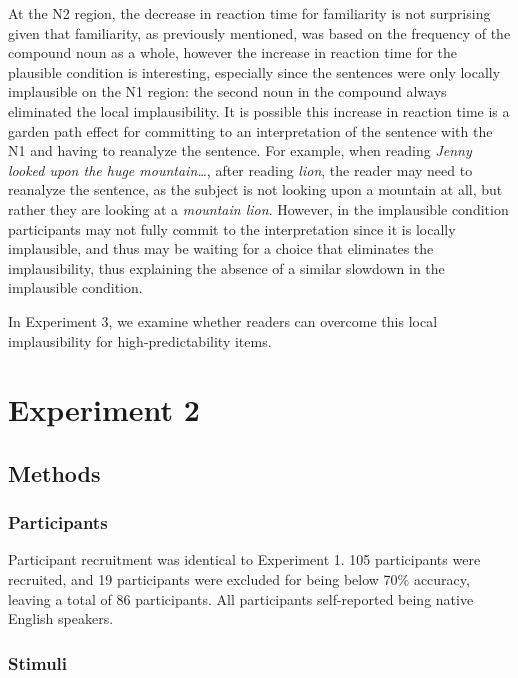 \documentclass[
  12pt,
  letterpaper,
]{scrreprt}
\begin{document}
At the N2 region, the decrease in reaction time for familiarity is not
surprising given that familiarity, as previously mentioned, was based on
the frequency of the compound noun as a whole, however the increase in
reaction time for the plausible condition is interesting, especially
since the sentences were only locally implausible on the N1 region: the
second noun in the compound always eliminated the local implausibility.
It is possible this increase in reaction time is a garden path effect
for committing to an interpretation of the sentence with the N1 and
having to reanalyze the sentence. For example, when reading \emph{Jenny
looked upon the huge mountain\ldots{}}, after reading \emph{lion}, the
reader may need to reanalyze the sentence, as the subject is not looking
upon a mountain at all, but rather they are looking at a \emph{mountain
lion}. However, in the implausible condition participants may not fully
commit to the interpretation since it is locally implausible, and thus
may be waiting for a choice that eliminates the implausibility, thus
explaining the absence of a similar slowdown in the implausible
condition.

In Experiment 3, we examine whether readers can overcome this local
implausibility for high-predictability items.

\section{Experiment 2}\label{experiment-2}

\subsection{Methods}\label{methods-1}

\subsubsection{Participants}\label{participants-1}

Participant recruitment was identical to Experiment 1. 105 participants
were recruited, and 19 participants were excluded for being below 70\%
accuracy, leaving a total of 86 participants. All participants
self-reported being native English speakers.

\subsubsection{Stimuli}\label{stimuli-1}
\end{document}
